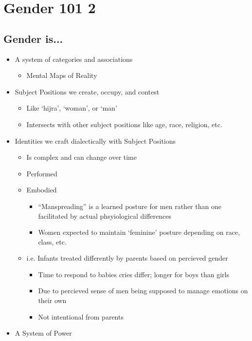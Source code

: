 \documentclass[a4paper]{article}
\begin{document}
\setcounter{section}{10} %
\section{Gender 101 2}
\subsection{Gender is...}
\begin{itemize}
  \item A system of categories and associations \begin{itemize}
    \item Mental Maps of Reality
  \end{itemize}
  \item Subject Positions we create, occupy, and contest \begin{itemize}
    \item Like `hijra', `woman', or `man'
    \item Intersects with other subject positions like age, race, religion, etc.
  \end{itemize}
  \item Identities we craft dialectically with Subject Positions \begin{itemize}
    \item Is complex and can change over time
    \item Performed
    \item Embodied \begin{itemize}
      \item ``Manspreading'' is a learned posture for men rather than one facilitated by actual phsyiological differences
      \item Women expected to maintain `feminine' posture depending on race, class, etc.
    \end{itemize}
    \item i.e. Infants treated differently by parents based on percieved gender \begin{itemize}
      \item Time to respond to babies cries differ; longer for boys than girls
      \item Due to percieved sense of men being supposed to manage emotions on their own
      \item Not intentional from parents
    \end{itemize}
  \end{itemize}
  \item A System of Power \begin{itemize}

\end{itemize}
\end{itemize}
\end{document}
